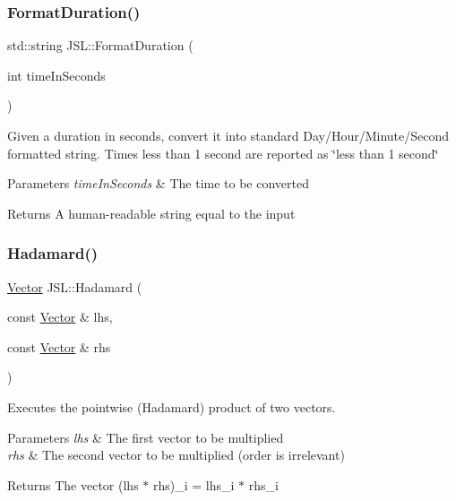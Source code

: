 \subsubsection{\texorpdfstring{Format\+Duration()}{FormatDuration()}}
{\footnotesize\ttfamily std\+::string J\+S\+L\+::\+Format\+Duration (\begin{DoxyParamCaption}\item[{int}]{time\+In\+Seconds }\end{DoxyParamCaption})\hspace{0.3cm}{\ttfamily [inline]}}

Given a duration in seconds, convert it into standard Day/\+Hour/\+Minute/\+Second formatted string. Times less than 1 second are reported as \char`\"{}less than 1 second\char`\"{} 
\begin{DoxyParams}{Parameters}
{\em time\+In\+Seconds} & The time to be converted \\
\hline
\end{DoxyParams}
\begin{DoxyReturn}{Returns}
A human-\/readable string equal to the input 
\end{DoxyReturn}
\mbox{\label{namespaceJSL_a6fd4487b0a8ac5713df4a37079287913}} 
\subsubsection{\texorpdfstring{Hadamard()}{Hadamard()}}
{\footnotesize\ttfamily \hyperlink{classJSL_1_1Vector}{Vector} J\+S\+L\+::\+Hadamard (\begin{DoxyParamCaption}\item[{const \hyperlink{classJSL_1_1Vector}{Vector} \&}]{lhs,  }\item[{const \hyperlink{classJSL_1_1Vector}{Vector} \&}]{rhs }\end{DoxyParamCaption})\hspace{0.3cm}{\ttfamily [inline]}}



Executes the pointwise (Hadamard) product of two vectors. 


\begin{DoxyParams}{Parameters}
{\em lhs} & The first vector to be multiplied \\
\hline
{\em rhs} & The second vector to be multiplied (order is irrelevant) \\
\hline
\end{DoxyParams}
\begin{DoxyReturn}{Returns}
The vector (lhs $\ast$ rhs)\+\_\+i = lhs\+\_\+i $\ast$ rhs\+\_\+i 
\end{DoxyReturn}
\mbox{\label{namespaceJSL_a47d8cb112d513ee5a3ae38ca6a89743d}} 
